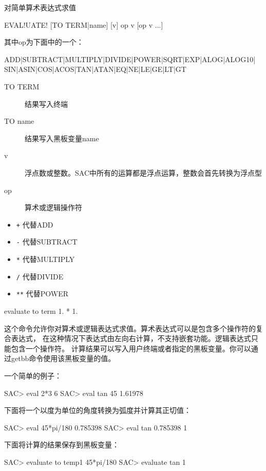 \label{cmd:evaluate}

对简单算术表达式求值

\begin{SACSTX}
EVAL!UATE! [TO TERM|name] [v] op v [op v ...]
\end{SACSTX}
其中op为下面中的一个：
\begin{SACSTX}
ADD|SUBTRACT|MULTIPLY|DIVIDE|POWER|SQRT|EXP|ALOG|ALOG10|
SIN|ASIN|COS|ACOS|TAN|ATAN|EQ|NE|LE|GE|LT|GT
\end{SACSTX}

\begin{description}
\item [TO TERM] 结果写入终端
\item [TO name] 结果写入黑板变量name
\item [v] 浮点数或整数。SAC中所有的运算都是浮点运算，整数会首先转换为浮点型
\item [op] 算术或逻辑操作符
\end{description}

\begin{itemize}
\item \texttt{+} 代替ADD
\item \texttt{-} 代替SUBTRACT
\item \texttt{*} 代替MULTIPLY
\item \texttt{/} 代替DIVIDE
\item \texttt{**} 代替POWER
\end{itemize}

\begin{SACDFT}
evaluate to term 1. * 1.
\end{SACDFT}

这个命令允许你对算术或逻辑表达式求值。算术表达式可以是包含多个操作符的复合表达式，
在这种情况下表达式由左向右计算，不支持嵌套功能。逻辑表达式只能包含一个操作符。
计算结果可以写入用户终端或者指定的黑板变量。你可以通过getbb命令使用该黑板变量的值。

一个简单的例子：
\begin{SACCode}
SAC> eval 2*3
 6
SAC> eval tan 45
1.61978
\end{SACCode}

下面将一个以度为单位的角度转换为弧度并计算其正切值：
\begin{SACCode}
SAC> eval 45*pi/180
 0.785398
SAC> eval tan 0.785398
 1
\end{SACCode}

下面将计算的结果保存到黑板变量：
\begin{SACCode}
SAC> evaluate to temp1 45*pi/180
SAC> evaluate tan %
 1
\end{SACCode}

